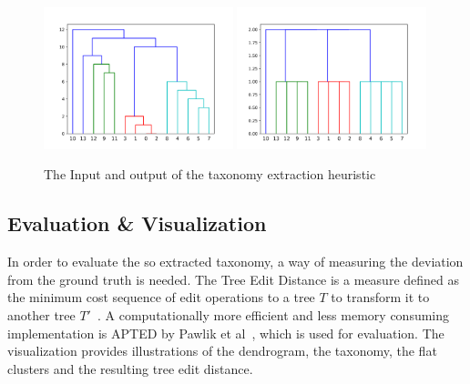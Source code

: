 \begin{figure}[htp]
    \includegraphics[width=0.49\textwidth]{img/extract_ex_dendro.png}
        \includegraphics[width=0.49\textwidth]{img/extract_ex_taxo.png}
    \caption{The Input and output of the taxonomy extraction heuristic}
    \label{fig:my_label}
\end{figure} 
 
 \subsection{Evaluation \& Visualization}\label{\positionnumber}
 In order to evaluate the so extracted taxonomy, a way of measuring the deviation from the ground truth is needed. The Tree Edit Distance is a measure defined as the minimum cost sequence of edit operations to a tree $T$ to transform it to another tree $T'$~\cite{Tai:1979:TCP:322139.322143}. A computationally more efficient and less memory consuming implementation is APTED by Pawlik et al~\cite{pawlik2016tree}, which is used for evaluation. The visualization provides illustrations of the dendrogram, the taxonomy, the flat clusters and the resulting tree edit distance.

